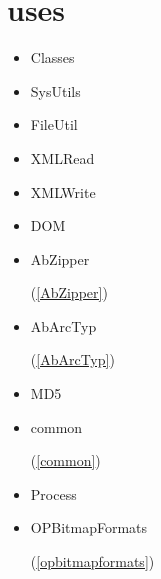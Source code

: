 \documentclass{report}
\begin{document}
\section{uses}
\begin{itemize}
\item \begin{ttfamily}Classes\end{ttfamily}\item \begin{ttfamily}SysUtils\end{ttfamily}\item \begin{ttfamily}FileUtil\end{ttfamily}\item \begin{ttfamily}XMLRead\end{ttfamily}\item \begin{ttfamily}XMLWrite\end{ttfamily}\item \begin{ttfamily}DOM\end{ttfamily}\item \begin{ttfamily}AbZipper\end{ttfamily}(\ref{AbZipper})\item \begin{ttfamily}AbArcTyp\end{ttfamily}(\ref{AbArcTyp})\item \begin{ttfamily}MD5\end{ttfamily}\item \begin{ttfamily}common\end{ttfamily}(\ref{common})\item \begin{ttfamily}Process\end{ttfamily}\item \begin{ttfamily}OPBitmapFormats\end{ttfamily}(\ref{opbitmapformats})\end{itemize}
\end{document}
